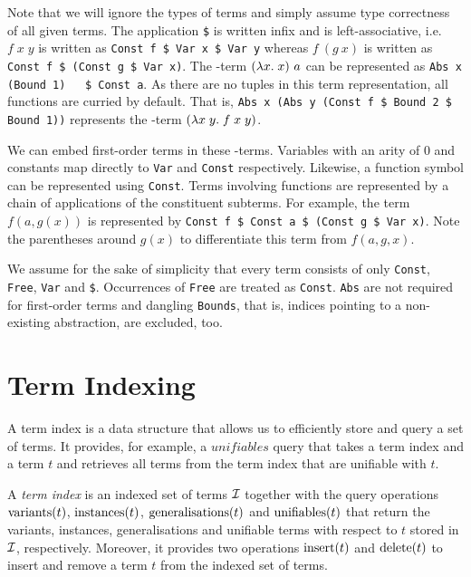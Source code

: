 Note that we will ignore the types of terms and simply assume type correctness of all given terms.
The application \lstinline{$} is written infix and is left-associative, i.e. $f\;x\;y$ is written as \lstinline{Const f $ Var x $ Var y} whereas $f\ (g\ x)$ is written as \lstinline{Const f $ (Const g $ Var x)}.
The \lam -term $(\lambda x.\;x)\ a$ can be represented as \lstinline{Abs x (Bound 1)   $ Const a}.
As there are no tuples in this term representation, all functions are curried by default. That is, \lstinline{Abs x (Abs y (Const f $ Bound 2 $ Bound 1))} represents the \lam -term $(\lambda x\;y.\;f\;x\;y)$.

We can embed first-order terms in these \lam -terms. Variables with an arity of $0$ and constants map directly to \lstinline{Var} and \lstinline{Const} respectively. Likewise, a function symbol can be represented using \lstinline{Const}. Terms involving functions are represented by a chain of applications of the constituent subterms. For example, the term $f(a,g(x))$ is represented by \lstinline{Const f $ Const a $ (Const g $ Var x)}. Note the parentheses around $g(x)$ to differentiate this term from $f(a,g,x)$.

We assume for the sake of simplicity that every term consists of only \lstinline{Const}, \lstinline{Free}, \lstinline{Var} and \lstinline{$}. Occurrences of \lstinline{Free} are treated as \lstinline{Const}. \lstinline{Abs} are not required for first-order terms and dangling \lstinline{Bounds}, that is, indices pointing to a non-existing abstraction, are excluded, too.

\section{Term Indexing} \label{termindex}
  A term index is a data structure that allows us to efficiently store and query a set of terms. It provides, for example, a $unifiables$ query that takes a term index and a term $t$ and retrieves all terms from the term index that are unifiable with $t$.
\begin{defn}
  A \emph{term index} is an indexed set of terms $\mathcal{I}$ together with the query operations $\mathrm{variants} (t)$, $\mathrm{instances} (t)$, $\mathrm{generalisations} (t)$ and $\mathrm{unifiables} (t)$ that return the variants, instances, generalisations and unifiable terms with respect to $t$ stored in $\mathcal{I}$, respectively. Moreover, it provides two operations $\mathrm{insert} (t)$ and $\mathrm{delete} (t)$ to insert and remove a term $t$ from the indexed set of terms.
\end{defn}

